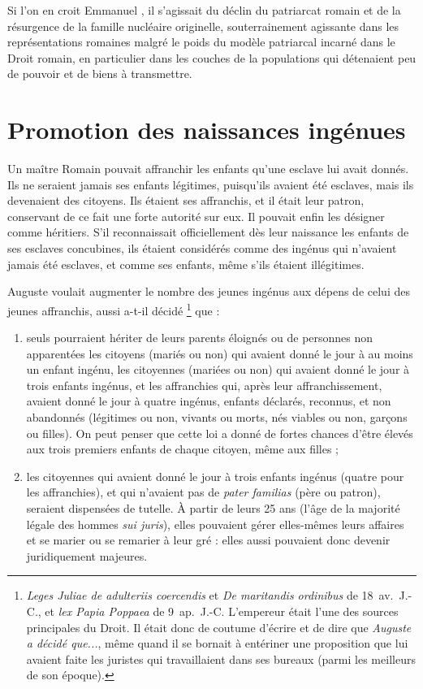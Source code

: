  Si l'on en croit Emmanuel , il s'agissait du déclin du patriarcat romain et de la résurgence de la famille nucléaire originelle, souterrainement agissante dans les représentations romaines malgré le poids du modèle patriarcal incarné dans le Droit romain, en particulier dans les couches de la populations qui détenaient peu de pouvoir et de biens à transmettre. 


\section{Promotion des naissances ingénues}

 Un maître Romain pouvait affranchir les enfants qu'une esclave lui avait donnés. Ils ne seraient jamais ses enfants légitimes, puisqu'ils avaient été esclaves, mais ils devenaient des citoyens. Ils étaient ses affranchis, et il était leur patron, conservant de ce fait une forte autorité sur eux. Il pouvait enfin les désigner comme héritiers. S'il reconnaissait officiellement dès leur naissance les enfants de ses esclaves concubines, ils étaient considérés comme des ingénus qui n'avaient jamais été esclaves, et comme ses enfants, même s'ils étaient illégitimes. 

 Auguste voulait augmenter le nombre des jeunes ingénus aux dépens de celui des jeunes affranchis, aussi a-t-il décidé%
\footnote{\emph{Leges Juliae de adulteriis coercendis} et \emph{De maritandis ordinibus} de \mbox{18 av. J.-C.}, et \emph{lex Papia Poppaea} de \mbox{9 ap. J.-C.} L'empereur était l'une des sources principales du Droit. Il était donc de coutume d'écrire et de dire que {\emph{Auguste a décidé que...}}, même quand il se bornait à entériner une proposition que lui avaient faite les juristes qui travaillaient dans ses bureaux (parmi les meilleurs de son époque).}
que :
\begin{enumerate}
\item seuls pourraient hériter de leurs parents éloignés ou de personnes non apparentées les citoyens (mariés ou non) qui avaient donné le jour à au moins un enfant ingénu, les citoyennes (mariées ou non) qui avaient donné le jour à trois enfants ingénus, et les affranchies qui, après leur affranchissement, avaient donné le jour à quatre ingénus, enfants déclarés, reconnus, et non abandonnés (légitimes ou non, vivants ou morts, nés viables ou non, garçons ou filles). On peut penser que cette loi a donné de fortes chances d'être élevés aux trois premiers enfants de chaque citoyen, même aux filles ;
\item les citoyennes qui avaient donné le jour à trois enfants ingénus (quatre pour les affranchies), et qui n'avaient pas de \emph{pater familias} (père ou patron), seraient dispensées de tutelle. À partir de leurs 25 ans (l'âge de la majorité légale des hommes \emph{sui juris}), elles pouvaient gérer elles-mêmes leurs affaires et se marier ou se remarier à leur gré : elles aussi pouvaient donc devenir juridiquement majeures. 
\end{enumerate}


